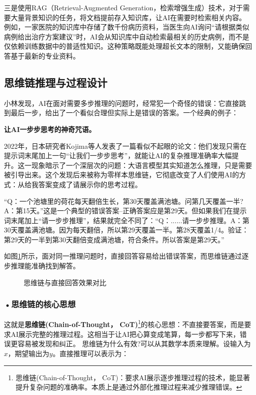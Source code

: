 三是使用RAG（Retrieval-Augmented Generation，检索增强生成）技术，对于需要大量背景知识的任务，将文档提前存入知识库，让AI在需要时检索相关内容。例如，一家医院的知识库中存储了数千份病历资料，当医生向AI询问“请根据类似病例给出治疗方案建议”时，AI会从知识库中自动检索最相关的历史病例，而不是仅依赖训练数据中的普适性知识。这种策略既能处理超长文本的限制，又能确保回答基于最新的专业资料。

\subsection{思维链推理与过程设计}

小林发现，AI在面对需要多步推理的问题时，经常犯一个奇怪的错误：它直接跳到最后一步，给出了一个看似合理但实际上是错误的答案。一个经典的例子：
\begin{funbox}
\textbf{让AI一步步思考的神奇咒语。} 

2022年，日本研究者Kojima等人发表了一篇看似不起眼的论文：他们发现只需在提示词末尾加上一句“让我们一步步思考”，就能让AI的复杂推理准确率大幅提升。这一现象暗示了一个深层次的问题：大语言模型其实知道怎么推理，只是需要被引导出来。这个发现后来被称为零样本思维链，它彻底改变了人们使用AI的方式：从给我答案变成了请展示你的思考过程。
\end{funbox}


“Q：一个池塘里的荷花每天翻倍生长，第30天覆盖满池塘。问第几天覆盖一半?A：第15天。”这是一个典型的错误答案--正确答案应是第29天。但如果我们在提示词末尾加上“请一步步推理”，结果就完全不同了：“Q：......请一步步推理。A：第30天覆盖满池塘。因为每天翻倍，所以第29天覆盖一半。第28天覆盖1/4。验证：第29天的一半到第30天翻倍变成满池塘，符合条件。所以答案是第29天。”

如图\ref{fig:ch3_3_8}所示，面对同一推理问题时，直接回答容易给出错误答案，而思维链通过逐步推理能准确找到解答。

\begin{figure}[H]
\centering
{}
\caption{思维链与直接回答效果对比}
\label{fig:ch3_3_8}
\end{figure}

\subsubsection*{\textbf{•思维链的核心思想}}


这就是\textbf{思维链(Chain-of-Thought， CoT)}\footnote{思维链(Chain-of-Thought， CoT)：要求AI展示逐步推理过程的技术，能显著提升复杂问题的准确率。本质上是通过外部化推理过程来减少推理错误。}的核心思想：不直接要答案，而是要求AI展示完整的推理过程。这相当于让AI把心算变成笔算，每一步都写下来，错误更容易被发现和纠正。
思维链为什么有效?可以从其数学本质来理解。设输入为$x$，期望输出为$y$。直接推理可以表示为：

